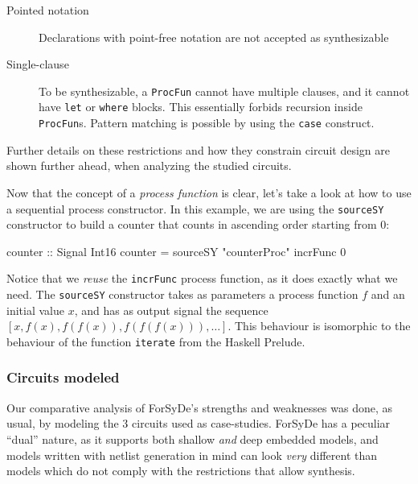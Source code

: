             \begin{description}
                \item[Pointed notation] Declarations with point-free notation are not
                    accepted as synthesizable

                \item[Single-clause] To be synthesizable, a \texttt{ProcFun} cannot have multiple
                    clauses, and it cannot have \texttt{let} or \texttt{where} blocks.  This
                    essentially forbids recursion inside \texttt{ProcFun}s. Pattern matching is
                    possible by using the \texttt{case} construct.
            \end{description}

            Further details on these restrictions and how they constrain circuit design are shown
            further ahead, when analyzing the studied circuits.

            Now that the concept of a \emph{process function} is clear, let's take a look at how to
            use a sequential process constructor. In this example, we are using the
            \texttt{sourceSY} constructor to build a counter that counts in ascending order starting
            from 0:

            \begin{haskellcode}
        counter :: Signal Int16
        counter = sourceSY "counterProc" incrFunc 0
            \end{haskellcode}

            Notice that we \emph{reuse} the \texttt{incrFunc} process function, as it does exactly
            what we need. The \texttt{sourceSY} constructor takes as parameters a process function
            $f$ and an initial value $x$, and has as output signal the sequence $ [x, f(x), f(f(x)),
            f(f(f(x))), \ldots] $. This behaviour is isomorphic to the behaviour of the function
            \texttt{iterate} from the Haskell Prelude.


        \subsubsection{Circuits modeled}
        \label{subsubsec:forsyde-circuits}
            Our comparative analysis of ForSyDe's strengths and weaknesses was done, as usual, by
            modeling the 3 circuits used as case-studies. ForSyDe has a peculiar ``dual'' nature,
            as it supports both shallow \emph{and} deep embedded models, and models written with
            netlist generation in mind can look \emph{very} different than models which do not
            comply with the restrictions that allow synthesis.

